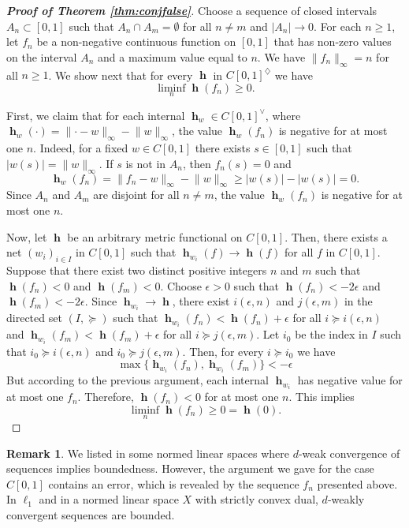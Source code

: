 \documentclass[11pt]{amsart}
\theoremstyle{definition}
\newtheorem{remark}[theorem]{Remark}
\numberwithin{equation}{section}
\DeclareMathOperator{\h}{\mathbf{h}} %
\newcommand{\abs}[1]{\lvert#1\rvert} %
\newcommand{\norm}[1]{\lVert#1\rVert} %
\numberwithin{equation}{section}
\begin{document}
\begin{proof}[\bf Proof of Theorem \ref{thm:conjfalse}]
Choose a sequence of closed intervals
$A_n\subset[0,1]$ such that
$A_n\cap A_m = \emptyset$ for all $n\neq m$ and $|A_n|\to 0$. 
For each $n\geq 1$, 
let $f_n$ be a non-negative continuous function on $[0,1]$
that has non-zero values on the interval $A_n$
and a maximum value equal to $n$. We have $\norm{f_n}_\infty = n$
for all $n\geq 1$. We show next that for every
$\h$ in $C[0,1]^\diamondsuit$ we have
\[
 \liminf_{n}\h(f_n) \geq 0.
\]

First, we claim that for each internal $\h_w \in C[0,1]^\vee$,
where $\h_w(\cdot)=\norm{\cdot - w}_\infty-\norm{w}_\infty$, the
value $\h_w(f_n)$ is negative for at most one $n$. Indeed, for a
fixed $w\in C[0,1]$ there exists $s\in [0,1]$ such that
$\abs{w(s)}=\norm{w}_\infty$. If $s$ is not in $A_n$, then
$f_n(s)=0$ and 
\[
    \h_w(f_n)=\norm{f_n - w}_\infty - \norm{w}_\infty \geq \abs{w(s)}-\abs{w(s)}=0.
\]
Since $A_n$ and $A_m$ are disjoint for all $n\neq m$, the
value $\h_w(f_n)$ is negative for at most one $n$.

Now, let $\h$ be an arbitrary metric functional on $C[0,1]$.
Then, there exists a net $(w_i)_{i\in I}$ in $C[0,1]$ such that
$\h_{w_i}(f) \to \h(f)$ for all $f$ in $C[0,1]$. Suppose that 
there exist two distinct positive integers $n$ and $m$ such that
$\h(f_n) < 0$ and $\h(f_m) < 0$. Choose $\epsilon >0$ such that
$\h(f_n)< -2\epsilon$ and $\h(f_m)< -2\epsilon$. Since
$\h_{w_i} \to \h$, there exist $i(\epsilon,n)$ and $j(\epsilon,m)$
in the directed set $(I,\succcurlyeq)$ such that 
$\h_{w_i}(f_n) < \h(f_n) + \epsilon$
for all $i\succcurlyeq i(\epsilon,n)$ and 
$\h_{w_i}(f_m) < \h(f_m) + \epsilon$ for all $i\succcurlyeq j(\epsilon,m)$.
Let $i_0$ be the index in $I$ such that $i_0 \succcurlyeq i(\epsilon,n)$ and 
$i_0 \succcurlyeq j(\epsilon,m)$. Then, for every $i\succcurlyeq i_0$ 
we have
\[
 \max\{\h_{w_i}(f_n),\h_{w_i}(f_m)\} < -\epsilon
\]
But according to the previous argument, each internal $\h_{w_i}$ has 
negative value for at most one $f_n$. Therefore, $\h(f_n) < 0$
for at most one $n$. This implies 
\[
 \liminf_{n}\h(f_n) \geq 0 =\h(0).
\]
\end{proof}

\begin{remark}
We listed in \cite{GNweakconv} some normed linear spaces where
$d$-weak convergence of sequences implies boundedness. 
However, the argument we gave for the case $C[0,1]$ contains an 
error, which is revealed by the sequence $f_n$ 
presented above.
In $\ell_1$ and in a normed linear space $X$ with strictly convex 
dual, $d$-weakly convergent sequences are bounded.
\end{remark}
\end{document}
